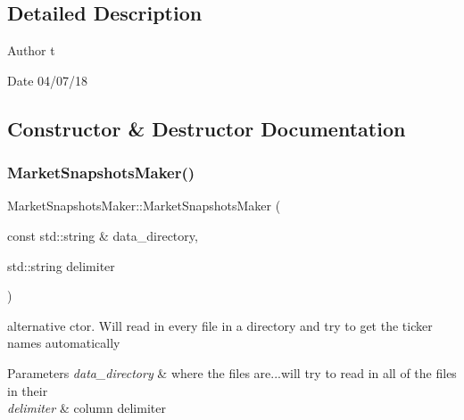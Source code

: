 \subsection{Detailed Description}
\begin{DoxyAuthor}{Author}
t 
\end{DoxyAuthor}
\begin{DoxyDate}{Date}
04/07/18 
\end{DoxyDate}


\subsection{Constructor \& Destructor Documentation}
\mbox{\label{classMarketSnapshotsMaker_a54050922d3dd9f554a5d3e4137e1963c}} 
\subsubsection{\texorpdfstring{Market\+Snapshots\+Maker()}{MarketSnapshotsMaker()}\hspace{0.1cm}{\footnotesize\ttfamily [1/2]}}
{\footnotesize\ttfamily Market\+Snapshots\+Maker\+::\+Market\+Snapshots\+Maker (\begin{DoxyParamCaption}\item[{const std\+::string \&}]{data\+\_\+directory,  }\item[{std\+::string}]{delimiter }\end{DoxyParamCaption})}



alternative ctor. Will read in every file in a directory and try to get the ticker names automatically 


\begin{DoxyParams}{Parameters}
{\em data\+\_\+directory} & where the files are...will try to read in all of the files in their \\
\hline
{\em delimiter} & column delimiter \\
\hline
\end{DoxyParams}
\mbox{\label{classMarketSnapshotsMaker_a8107a3b92c32118a667b5e86099ecde8}} 
